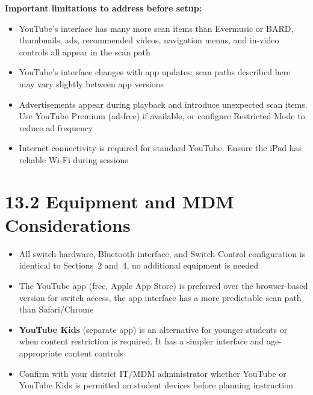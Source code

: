 \documentclass[justified,openright]{tufte-book}
\begin{document}
\textbf{Important limitations to address before setup:}

\begin{itemize}

\item
  YouTube's interface has many more scan items than Evermusic or BARD, thumbnails, ads, recommended videos, navigation menus, and
  in-video controls all appear in the scan path
\item
  YouTube's interface changes with app updates; scan paths described
  here may vary slightly between app versions
\item
  Advertisements appear during playback and introduce unexpected scan
  items. Use YouTube Premium (ad-free) if available, or configure
  Restricted Mode to reduce ad frequency
\item
  Internet connectivity is required for standard YouTube. Ensure the
  iPad has reliable Wi-Fi during sessions
\end{itemize}

\section{13.2 Equipment and MDM
Considerations}\label{youtube-equipment-mdm}


\begin{itemize}

\item
  All switch hardware, Bluetooth interface, and Switch Control
  configuration is identical to Sections~2 and~4, no additional
  equipment is needed
\item
  The YouTube app (free, Apple App Store) is preferred over the
  browser-based version for switch access, the app interface has
  a more predictable scan path than Safari/Chrome
\item
  \textbf{YouTube Kids} (separate app) is an alternative for younger
  students or when content restriction is required. It has a simpler
  interface and age-appropriate content controls
\item
  Confirm with your district IT/MDM administrator whether YouTube or
  YouTube Kids is permitted on student devices before planning
  instruction
\end{itemize}
\end{document}
